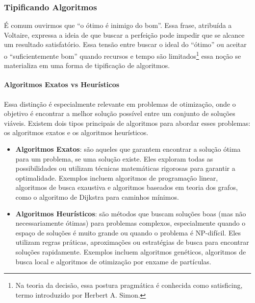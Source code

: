 \documentclass[12pt,a4paper]{article}
\def\emph#1{#1}%
\begin{document}
\subsubsection{Tipificando Algoritmos}

É comum ouvirmos que “o ótimo é inimigo do bom”. Essa frase, atribuída a Voltaire, expressa a ideia de que buscar a perfeição pode impedir que se alcance um resultado satisfatório. Essa tensão entre buscar o ideal do “ótimo”  ou aceitar o “suficientemente bom” quando recursos e tempo são limitados\footnote{Na teoria da decisão, essa postura pragmática é conhecida como \emph{satisficing}, termo introduzido por Herbert A. Simon.} essa noção se materializa em uma forma de tipificação de algoritmos.

\paragraph{Algoritmos Exatos vs Heurísticos}

\paragraph{}
Essa distinção é especialmente relevante em problemas de otimização, onde o objetivo é encontrar a melhor solução possível entre um conjunto de soluções viáveis. Existem dois tipos principais de algoritmos para abordar esses problemas: os \emph{algoritmos exatos} e os \emph{algoritmos heurísticos}.

\begin{itemize}\setlength{\itemsep}{2pt}
    \item \textbf{Algoritmos Exatos}: são aqueles que garantem encontrar a solução ótima para um problema, se uma solução existe. Eles exploram todas as possibilidades ou utilizam técnicas matemáticas rigorosas para garantir a optimalidade. Exemplos incluem algoritmos de programação linear, algoritmos de busca exaustiva e algoritmos baseados em teoria dos grafos, como o algoritmo de Dijkstra para caminhos mínimos.
    \item \textbf{Algoritmos Heurísticos}: são métodos que buscam soluções boas (mas não necessariamente ótimas) para problemas complexos, especialmente quando o espaço de soluções é muito grande ou quando o problema é NP-difícil. Eles utilizam regras práticas, aproximações ou estratégias de busca para encontrar soluções rapidamente. Exemplos incluem algoritmos genéticos, algoritmos de busca local e algoritmos de otimização por enxame de partículas.
\end{itemize}
\end{document}

